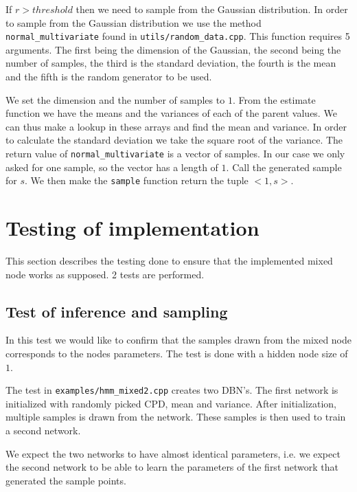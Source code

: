 \documentclass[10pt, journal, compsoc, a4paper]{IEEEtran}
\begin{document}
If $r > threshold$ then we need to sample from the Gaussian distribution. In order to sample from the Gaussian distribution we use the method \texttt{normal\_multivariate} found in \texttt{utils/random\_data.cpp}. This function requires 5 arguments. The first being the dimension of the Gaussian, the second being the number of samples, the third is the standard deviation, the fourth is the mean and the fifth is the random generator to be used. 

We set the dimension and the number of samples to $1$. From the estimate function we have the means and the variances of each of the parent values. We can thus make a lookup in these arrays and find the mean and variance. In order to calculate the standard deviation we take the square root of the variance. The return value of \texttt{normal\_multivariate} is a vector of samples. In our case we only asked for one sample, so the vector has a length of $1$. Call the generated sample for $s$. We then make the \texttt{sample} function return the tuple $<1, s>$.




\section{Testing of implementation} %
\label{sec:testing_of_implementation}

This section describes the testing done to ensure that the implemented mixed node works as supposed. 2 tests are performed.

\subsection{Test of inference and sampling} %
\label{sub:test_of_sampling}
In this test we would like to confirm that the samples drawn from the mixed node corresponds to the nodes parameters. The test is done with a hidden node size of $1$.

The test in \texttt{examples/hmm\_mixed2.cpp} creates two DBN's. The first network is initialized with randomly picked CPD, mean and variance. After initialization, multiple samples is drawn from the network. These samples is then used to train a second network. 

We expect the two networks to have almost identical parameters, i.e. we expect the second network to be able to learn the parameters of the first network that generated the sample points.
\end{document}
